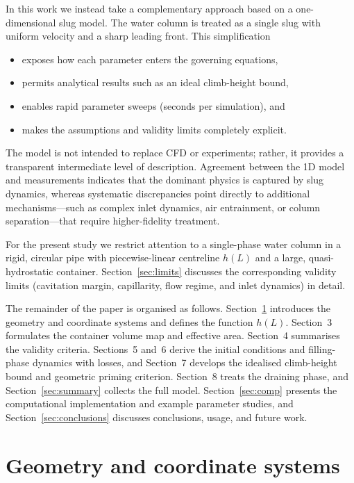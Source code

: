 \documentclass[11pt]{article}
\begin{document}
In this work we instead take a complementary approach based on a one-dimensional slug model. The water column is treated as a single slug with uniform velocity and a sharp leading front. This simplification
\begin{itemize}
  \item exposes how each parameter enters the governing equations,
  \item permits analytical results such as an ideal climb-height bound,
  \item enables rapid parameter sweeps (seconds per simulation), and
  \item makes the assumptions and validity limits completely explicit.
\end{itemize}
The model is not intended to replace CFD or experiments; rather, it provides a transparent intermediate level of description. Agreement between the 1D model and measurements indicates that the dominant physics is captured by slug dynamics, whereas systematic discrepancies point directly to additional mechanisms---such as complex inlet dynamics, air entrainment, or column separation---that require higher-fidelity treatment.

For the present study we restrict attention to a single-phase water column in a rigid, circular pipe with piecewise-linear centreline $h(L)$ and a large, quasi-hydrostatic container. Section~\ref{sec:limits} discusses the corresponding validity limits (cavitation margin, capillarity, flow regime, and inlet dynamics) in detail.

The remainder of the paper is organised as follows. Section~\ref{sec:geometry} introduces the geometry and coordinate systems and defines the function $h(L)$. Section~3 formulates the container volume map and effective area. Section~4 summarises the validity criteria. Sections~5 and~6 derive the initial conditions and filling-phase dynamics with losses, and Section~7 develops the idealised climb-height bound and geometric priming criterion. Section~8 treats the draining phase, and Section~\ref{sec:summary} collects the full model. Section~\ref{sec:comp} presents the computational implementation and example parameter studies, and Section~\ref{sec:conclusions} discusses conclusions, usage, and future work.

\section{Geometry and coordinate systems}
\label{sec:geometry}
\end{document}
